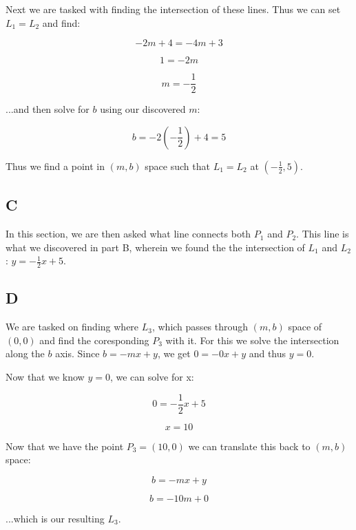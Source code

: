 \documentclass{article}
\begin{document}
Next we are tasked with finding the intersection of these lines. Thus we can set $L_1=L_2$ and find:

\begin{equation}
    -2m + 4 = -4m + 3
\end{equation}

\begin{equation}
    1 = -2m
\end{equation}

\begin{equation}
    m = -\frac{1}{2}
\end{equation}

\noindent ...and then solve for $b$ using our discovered $m$:

\begin{equation}
    b = -2(-\frac{1}{2}) + 4 = 5
\end{equation}

\noindent Thus we find a point in $(m,b)$ space such that $L_1=L_2$ at $(-\frac{1}{2}, 5)$.

\subsection*{C}

In this section, we are then asked what line connects both $P_1$ and $P_2$. This line is what we discovered in part B, wherein we found the the intersection of $L_1$ and $L_2$: $y = -\frac{1}{2}x + 5$.

\subsection*{D}

We are tasked on finding where $L_3$, which passes through $(m,b)$ space of $(0,0)$ and find the coresponding $P_3$ with it. For this we solve the intersection along the $b$ axis. Since $b = -mx + y$, we get $0 = -0x + y$ and thus $y = 0$.

Now that we know $y=0$, we can solve for x:

\begin{equation}
    0 = -\frac{1}{2}x + 5
\end{equation}

\begin{equation}
    x = 10
\end{equation}

\noindent Now that we have the point $P_3=(10,0)$ we can translate this back to $(m,b)$ space:

\begin{equation}
    b = -mx + y
\end{equation}

\begin{equation}
    b = -10m + 0
\end{equation}

\noindent ...which is our resulting $L_3$.
\end{document}
